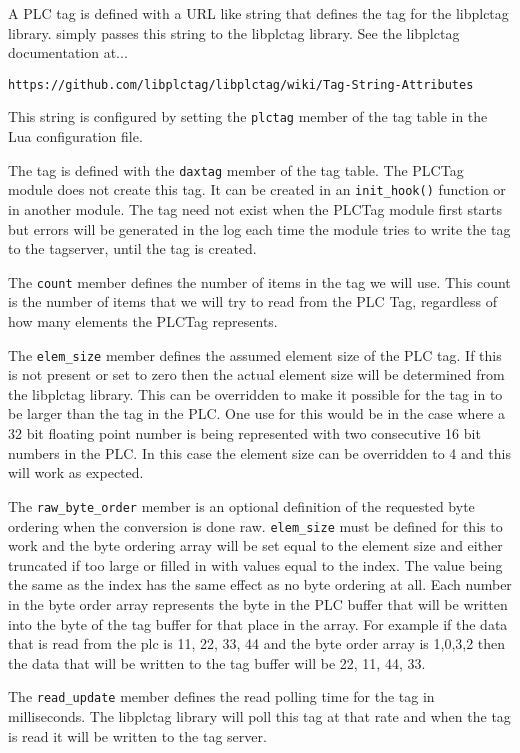 A PLC tag is defined with a URL like string that defines the tag
for the libplctag library.  \opendax{} simply passes this string to
the libplctag library.  See the libplctag documentation at...

\texttt{https://github.com/libplctag/libplctag/wiki/Tag-String-Attributes}

This string is configured by setting the \texttt{plctag}
member of the tag table in the Lua configuration file.

The \opendax{} tag is defined with the \texttt{daxtag} member of the
tag table.  The PLCTag module does not create this tag.  It can
be created in an \texttt{init\_hook()} function or in another module.
The tag need not exist when the PLCTag module first starts but errors
will be generated in the log each time the module tries to write the
tag to the tagserver, until the tag is created.

The \texttt{count} member defines the number of items in the \opendax
tag we will use.  This count is the number of items that we will try
to read from the PLC Tag, regardless of how many elements the PLCTag
represents.

The \texttt{elem\_size} member defines the assumed element size of
the PLC tag.  If this is not present or set to zero then the actual
element size will be determined from the libplctag library.  This 
can be overridden to make it possible for the tag in \opendax{} to be
larger than the tag in the PLC.  One use for this would be in the case
where a 32 bit floating point number is being represented with two
consecutive 16 bit numbers in the PLC.  In this case the element size
can be overridden to 4 and this will work as expected.

The \texttt{raw\_byte\_order} member is an optional definition
of the requested byte ordering when the conversion is done raw.
\texttt{elem\_size} must be defined for this to work and the byte ordering
array will be set equal to the element size and either truncated if too
large or filled in with values equal to the index.  The value being 
the same as the index has the same effect as no byte ordering at all.
Each number in the byte order array represents the byte in the PLC buffer
that will be written into the byte of the \opendax{} tag buffer for
that place in the array.  For example if the data that is read from the plc
is 11, 22, 33, 44 and the byte order array is {1,0,3,2} then the data that
will be written to the \opendax{} tag buffer will be 22, 11, 44, 33.

The \texttt{read\_update} member defines the read polling time
for the tag in milliseconds.  The libplctag library will poll this
tag at that rate and when the tag is read it will be written to the
\opendax{} tag server.

